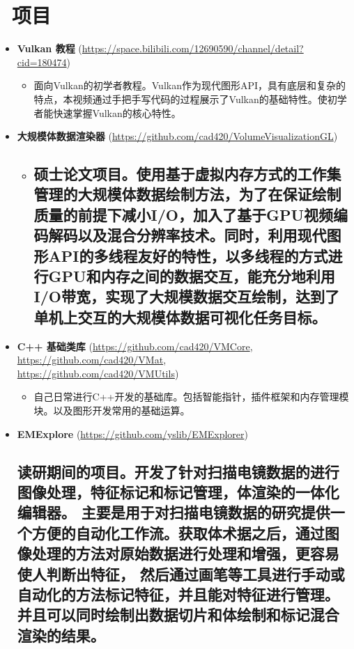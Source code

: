 \documentclass{resume}
\begin{document}
\section{\faUsers\ 项目}

\begin{itemize}

\item \textbf{Vulkan 教程} (\url{https://space.bilibili.com/12690590/channel/detail?cid=180474})

\begin{itemize}
  \item 面向Vulkan的初学者教程。Vulkan作为现代图形API，具有底层和复杂的特点，本视频通过手把手写代码的过程展示了Vulkan的基础特性。使初学者能快速掌握Vulkan的核心特性。
\end{itemize}


\item \textbf{大规模体数据渲染器} (\url{https://github.com/cad420/VolumeVisualizationGL})

\begin{itemize}
  \item
  \subsection{硕士论文项目。使用基于虚拟内存方式的工作集管理的大规模体数据绘制方法，为了在保证绘制质量的前提下减小I/O，加入了基于GPU视频编码解码以及混合分辨率技术。同时，利用现代图形API的多线程友好的特性，以多线程的方式进行GPU和内存之间的数据交互，能充分地利用I/O带宽，实现了大规模数据交互绘制，达到了单机上交互的大规模体数据可视化任务目标。}
\end{itemize}


\item \textbf{C++ 基础类库} (\url{https://github.com/cad420/VMCore}, \url{https://github.com/cad420/VMat},\\
 \url{https://github.com/cad420/VMUtils})

\begin{itemize}

\item 自己日常进行C++开发的基础库。包括智能指针，插件框架和内存管理模块。以及图形开发常用的基础运算。
\end{itemize}

\item \textbf{EMExplore} (\url{https://github.com/yslib/EMExplorer})

\subsection{
  读研期间的项目。开发了针对扫描电镜数据的进行图像处理，特征标记和标记管理，体渲染的一体化编辑器。
  主要是用于对扫描电镜数据的研究提供一个方便的自动化工作流。获取体术据之后，通过图像处理的方法对原始数据进行处理和增强，更容易使人判断出特征，
  然后通过画笔等工具进行手动或自动化的方法标记特征，并且能对特征进行管理。并且可以同时绘制出数据切片和体绘制和标记混合渲染的结果。
}

\end{itemize}
\end{document}
